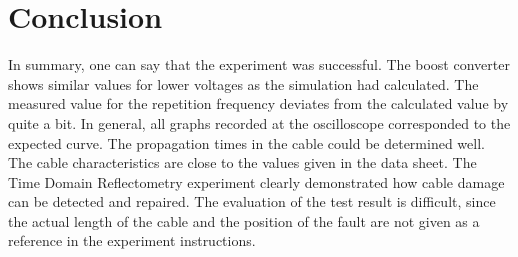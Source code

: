 \chapter{Conclusion}
%
In summary, one can say that the experiment was successful. The boost converter shows similar values for lower voltages
as the simulation had calculated. The measured value for the repetition frequency deviates from the calculated value by
quite a bit. In general, all graphs recorded at the oscilloscope corresponded to the expected curve. The propagation
times in the cable could be determined well. The cable characteristics are close to the values given in the data sheet.
The Time Domain Reflectometry experiment clearly demonstrated how cable damage can be detected and repaired. The evaluation
of the test result is difficult, since the actual length of the cable and the position of the fault are not given as a
reference in the experiment instructions.